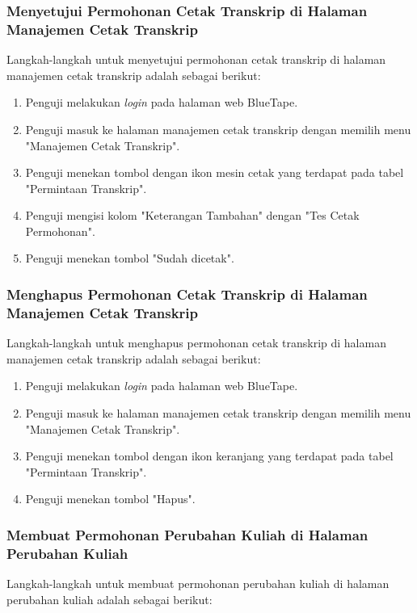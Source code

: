 \subsubsection{Menyetujui Permohonan Cetak Transkrip di Halaman Manajemen Cetak Transkrip}
\label{subsubsec:skenario_menyetujui_permohonan_cetak_transkrip_di_halaman_manajemen_cetak_transkrip}
Langkah-langkah untuk menyetujui permohonan cetak transkrip di halaman manajemen cetak transkrip adalah sebagai berikut:

\begin{enumerate}
    \item Penguji melakukan \textit{login} pada halaman web BlueTape.
    \item Penguji masuk ke halaman manajemen cetak transkrip dengan memilih menu "Manajemen Cetak Transkrip".
    \item Penguji menekan tombol dengan ikon mesin cetak yang terdapat pada tabel "Permintaan Transkrip".
    \item Penguji mengisi kolom "Keterangan Tambahan" dengan "Tes Cetak Permohonan".
    \item Penguji menekan tombol "Sudah dicetak".
\end{enumerate}

\subsubsection{Menghapus Permohonan Cetak Transkrip di Halaman Manajemen Cetak Transkrip}
\label{subsubsec:skenario_menghapus_permohonan_cetak_transkrip_di_halaman_manajemen_cetak_transkrip}
Langkah-langkah untuk menghapus permohonan cetak transkrip di halaman manajemen cetak transkrip adalah sebagai berikut:

\begin{enumerate}
    \item Penguji melakukan \textit{login} pada halaman web BlueTape.
    \item Penguji masuk ke halaman manajemen cetak transkrip dengan memilih menu "Manajemen Cetak Transkrip".
    \item Penguji menekan tombol dengan ikon keranjang yang terdapat pada tabel "Permintaan Transkrip".
    \item Penguji menekan tombol "Hapus".
\end{enumerate}

\subsubsection{Membuat Permohonan Perubahan Kuliah di Halaman Perubahan Kuliah}
\label{subsubsec:skenario_membuat_permohonan_perubahan_kuliah_di_halaman_perubahan_kuliah}
Langkah-langkah untuk membuat permohonan perubahan kuliah di halaman perubahan kuliah adalah sebagai berikut:

